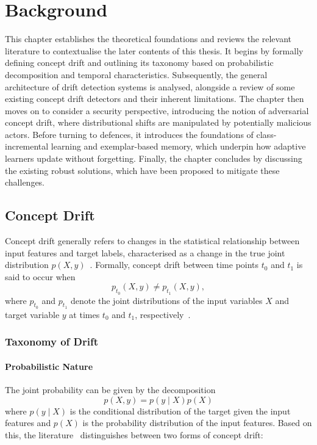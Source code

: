 \chapter{Background}
\label{ch:background}

This chapter establishes the theoretical foundations and reviews the relevant literature to contextualise the later contents of this thesis. It begins by formally defining concept drift and outlining its taxonomy based on probabilistic decomposition and temporal characteristics. Subsequently, the general architecture of drift detection systems is analysed, alongside a review of some existing concept drift detectors and their inherent limitations. The chapter then moves on to consider a security perspective, introducing the notion of adversarial concept drift, where distributional shifts are manipulated by potentially malicious actors. Before turning to defences, it introduces the foundations of class-incremental learning and exemplar-based memory, which underpin how adaptive learners update without forgetting. Finally, the chapter concludes by discussing the existing robust solutions, which have been proposed to mitigate these challenges.

\section{Concept Drift}
Concept drift generally refers to changes in the statistical relationship between input features and target labels, characterised as a change in the true joint distribution $p(X, y)$~\cite{Gao_2007}. Formally, concept drift between time points $t_0$ and $t_1$ is said to occur when
\begin{equation}
    p_{t_0}(X, y) \neq p_{t_1}(X, y),
\end{equation}
where $p_{t_0}$ and $p_{t_1}$ denote the joint distributions of the input variables $X$ and target variable $y$ at times $t_0$ and $t_1$, respectively~\cite{Gama_2014}.

\subsection{Taxonomy of Drift}
\subsubsection{Probabilistic Nature}
The joint probability can be given by the decomposition 
\begin{equation}
    p(X, y) = p(y \mid X)p(X)
\end{equation}
where $p(y \mid X)$ is the conditional distribution of the target given the input features and $p(X)$ is the probability distribution of the input features. Based on this, the literature~\cite{Gao_2007, Gama_2014, Korycki_2022} distinguishes between two forms of concept drift:

